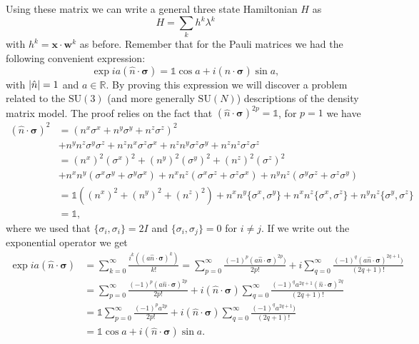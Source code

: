 Using these matrix we can write a general three state Hamiltonian $H$ as
\begin{equation*}
    H = \sum_k h^k\lambda^k
\end{equation*}
with $h^k=\mathbf{x}\cdot\mathbf{w}^k$ as before. Remember that for the Pauli matrices we had the following convenient expression:
\begin{equation*}
    \exp{{ia(\hat{n}\cdot\bm{\sigma})}} = \mathbb{1} \cos{a} + i(\hat{n}\cdot\bm{\sigma}) \sin{a},
\end{equation*}
with $|\Hat{n}|=1$ and $a\in \mathbb{R}$. By proving this expression we will discover a problem related to the $\text{SU}(3)$ (and more generally $\text{SU}(N)$) descriptions of the density matrix model. The proof relies on the fact that $(\hat{n}\cdot\bm{\sigma})^{2p}=\mathbb{1}$, for $p=1$ we have
\begin{align*}
    (\hat{n}\cdot\bm{\sigma})^2 &= (n^x \sigma^x + n^y \sigma^y + n^z \sigma^z)^2 \\
    &+ n^y n^z\sigma^y  \sigma^z + n^z n^x\sigma^z  \sigma^x +n^z n^y \sigma^z  \sigma^y + n^z n^z  \sigma^z \sigma^z\\
    &= (n^x)^2 (\sigma^x)^2 + (n^y)^2 (\sigma^y)^2  + (n^z)^2 (\sigma^z)^2 \\
    &+  n^x n^y(\sigma^x  \sigma^y + \sigma^y  \sigma^x) + n^x n^z(\sigma^x  \sigma^z + \sigma^z  \sigma^x) + n^y n^z(\sigma^y  \sigma^z + \sigma^z  \sigma^y)\\
    & = \mathbb{1}\left((n^x)^2 + (n^y)^2  + (n^z)^2 \right)+ n^x n^y\{\sigma^x, \sigma^y\} + n^x n^z\{\sigma^x, \sigma^z\} + n^y n^z\{\sigma^y, \sigma^z\}\\
    & = \mathbb{1},
\end{align*}
where we used that $\{\sigma_i, \sigma_i\} = 2I$ and $\{\sigma_i, \sigma_j\}=0$ for $i\neq j$. If we write out the exponential operator we get
\begin{align}
    \exp{{ia(\hat{n}\cdot\bm{\sigma})}} &= \sum_{k=0}^\infty \frac{i^k((a\hat{n}\cdot\bm{\sigma})^k)}{k!} = \sum_{p=0}^\infty \frac{(-1)^p(a\hat{n}\cdot\bm{\sigma})^{2p})}{2p!} + i\sum_{q=0}^\infty \frac{(-1)^q(a\hat{n}\cdot\bm{\sigma})^{2q+1})}{(2q+1)!}\nonumber\\
    & = \sum_{p=0}^\infty \frac{(-1)^p(a\hat{n}\cdot\bm{\sigma})^{2p}}{2p!} + i(\hat{n}\cdot\bm{\sigma})\sum_{q=0}^\infty \frac{(-1)^q a^{2q+1}(\hat{n}\cdot\bm{\sigma})^{2q}}{(2q+1)!}\nonumber\\
     &=  \mathbb{1} \sum_{p=0}^\infty \frac{(-1)^p a^{2p}}{2p!} + i(\hat{n}\cdot\bm{\sigma})\sum_{q=0}^\infty \frac{(-1)^q a^{2q+1})}{(2q+1)!}\nonumber\\
     & = \mathbb{1} \cos{a}+ i(\hat{n}\cdot\bm{\sigma})\sin{a} \label{eqn:exp_pauli}.
\end{align}
